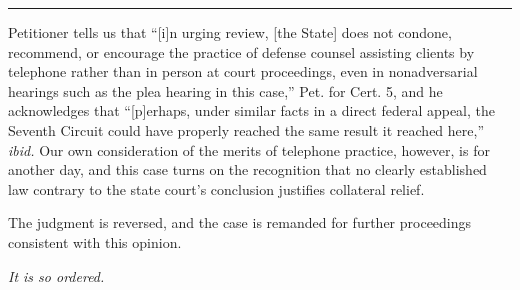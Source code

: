 \hrule

  Petitioner tells us that ``[i]n urging review, [the State] does not condone, recommend, or encourage the practice of defense counsel assisting clients by telephone rather than in person at court proceedings, even in nonadversarial hearings such as the plea hearing in this case,'' Pet. for Cert. 5, and he acknowledges that ``[p]erhaps, under similar facts in a direct federal appeal, the Seventh Circuit could have properly reached the same result it reached here,'' \emph{ibid}\emph{.} Our own consideration of the merits of telephone practice, however, is for another day, and this case turns on the recognition that no clearly established law contrary to the state court's conclusion justifies collateral relief.

  The judgment is reversed, and the case is remanded for further proceedings consistent with this opinion.

\begin{flushright}\emph{It is so ordered.}\end{flushright}

